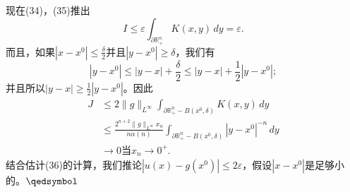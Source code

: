 \documentclass[leqno]{article}
\numberwithin{equation}{subsection}%
\begin{document}
现在(34)，(35)推出
\begin{equation*}
I\leq\varepsilon\int_{\partial\mathbb{R}_{+}^{n}}K(x,y)\,dy=\varepsilon.
\end{equation*}
而且，如果$|x-x^{0}|\leq\frac{\delta}{2}$并且$|y-x^{0}|\geq\delta$，我们有
\begin{equation*}
|y-x^{0}|\leq|y-x|+\frac{\delta}{2}\leq|y-x|+\frac{1}{2}|y-x^{0}|;
\end{equation*}
并且所以$|y-x|\geq\frac{1}{2}|y-x^{0}|$。因此
\begin{equation*}
\begin{aligned}
J&\leq 2\|g\|_{L^{\infty}}\int_{\partial \mathbb{R}_{+}^{n}-B(x^{0},\delta)}K(x,y)\,dy\\
&\leq \frac{2^{n+2}\|g\|_{L^{\infty}}x_{n}}{n\alpha(n)}\int_{\partial\mathbb{R}_{+}^{n}-B(x^{0},\delta)}|y-x^{0}|^{-n}\,dy\\
&\rightarrow 0 \text{当}x_{n}\rightarrow 0^{+}.
\end{aligned}
\end{equation*}
结合估计(36)的计算，我们推论$|u(x)-g(x^{0})|\leq 2\varepsilon$，假设$|x-x^{0}|$是足够小的。$\hfill\qedsymbol$
\end{document}
